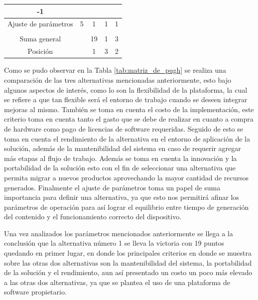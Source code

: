 \documentclass[12pt]{article}
\begin{document}
\begin{table}[h!]
{\begin{tabular}{ccccc}
    \multicolumn{1}{c|}{-1} \\ \hline
  \multicolumn{1}{|c|}{\cellcolor[HTML]{93C47D} Ajuste de parámetros} &
    \multicolumn{1}{c|}{5} &
    \multicolumn{1}{c|}{1} &
    \multicolumn{1}{c|}{1} &
    \multicolumn{1}{c|}{1} \\ \hline
  \multicolumn{1}{l}{} &
    \multicolumn{1}{l}{} &
    \multicolumn{1}{l}{} &
    \multicolumn{1}{l}{} &
    \multicolumn{1}{l}{} \\ \hline
  \multicolumn{1}{|c|}{\cellcolor[HTML]{93C47D} Suma general} &
    \multicolumn{1}{l|}{} &
    \multicolumn{1}{c|}{19} &
    \multicolumn{1}{c|}{1} &
    \multicolumn{1}{c|}{3} \\ \hline
  \multicolumn{1}{|c|}{\cellcolor[HTML]{93C47D} Posición} &
    \multicolumn{1}{l|}{} &
    \multicolumn{1}{c|}{1} &
    \multicolumn{1}{c|}{3} &
    \multicolumn{1}{c|}{2} \\ \hline
  \end{tabular}%
  }
  \end{table}

Como se pudo observar en la Tabla \ref{tab:matriz_de_pugh} se realiza una comparación de las tres alternativas mencionadas anteriormente, esto bajo algunos aspectos de interés, como lo son la flexibilidad de la plataforma, la cual se refiere a que tan flexible será el entorno de trabajo cuando se deseen integrar mejoras al mismo. También se toma en cuenta el costo de la implementación, este criterio toma en cuenta tanto el gasto que se debe de realizar en cuanto a compra de hardware como pago de licencias de software requeridas. Seguido de esto se toma en cuenta el rendimiento de la alternativa en el entorno de aplicación de la solución, además de la mantenibilidad del sistema en caso de requerir agregar más etapas al flujo de trabajo. Además se toma en cuenta la innovación y la portabilidad de la solución esto con el fin de seleccionar una alternativa que permita migrar a nuevos productos aprovechando la mayor cantidad de recursos generados. Finalmente el ajuste de parámetros toma un papel de suma importancia para definir una alternativa, ya que esto nos permitirá afinar los parámetros de operación para así lograr el equilibrio entre tiempo de generación del contenido y el funcionamiento correcto del dispositivo.


Una vez analizados los parámetros mencionados anteriormente se llega a la conclusión que la alternativa número 1 se lleva la victoria con 19 puntos quedando en primer lugar, en donde los principales criterios en donde se muestra sobre las otras dos alternativas son la mantenibilidad del sistema, la portabilidad de la solución y el rendimiento, aun así presentado un costo un poco más elevado a las otras dos alternativas, ya que se plantea el uso de una plataforma de software propietario.
  
\end{document}
